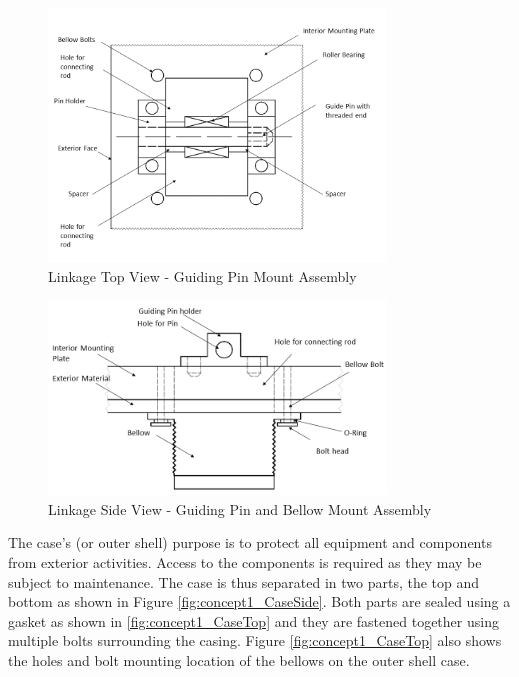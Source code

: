\begin{figure}[H]
    \centering
    \includegraphics[width=0.8\textwidth]{img/C1/GuidingPin_Top.PNG}
    \caption{Linkage Top View - Guiding Pin Mount Assembly}
    \label{fig:concept1_GuidingPinTop}
\end{figure}

\begin{figure}[H]
    \centering
    \includegraphics[width=0.8\textwidth]{img/C1/GuidingPin_Side.PNG}
    \caption{Linkage Side View - Guiding Pin and Bellow Mount Assembly}
    \label{fig:concept1_GuidingPinSide}
\end{figure}

The case's (or outer shell) purpose is to protect all equipment and components from exterior activities. Access to the components is required as they may be subject to maintenance. The case is thus separated in two parts, the top and bottom as shown in Figure \ref{fig:concept1_CaseSide}. Both parts are sealed using a gasket as shown in \ref{fig:concept1_CaseTop} and they are fastened together using multiple bolts surrounding the casing. Figure \ref{fig:concept1_CaseTop} also shows the holes and bolt mounting location of the bellows on the outer shell case.

